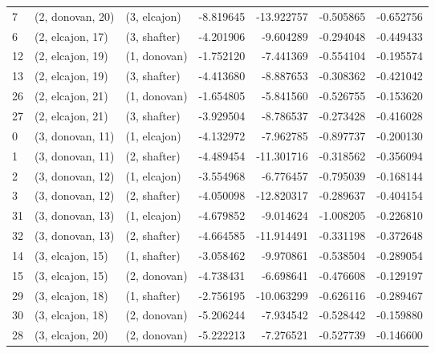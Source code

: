 \begin{tabular}{lllrrrr}
7  &  (2, donovan, 20) &     (3, elcajon) &  -8.819645 & -13.922757 &  -0.505865 & -0.652756 \\
6  &  (2, elcajon, 17) &     (3, shafter) &  -4.201906 &  -9.604289 &  -0.294048 & -0.449433 \\
12 &  (2, elcajon, 19) &     (1, donovan) &  -1.752120 &  -7.441369 &  -0.554104 & -0.195574 \\
13 &  (2, elcajon, 19) &     (3, shafter) &  -4.413680 &  -8.887653 &  -0.308362 & -0.421042 \\
26 &  (2, elcajon, 21) &     (1, donovan) &  -1.654805 &  -5.841560 &  -0.526755 & -0.153620 \\
27 &  (2, elcajon, 21) &     (3, shafter) &  -3.929504 &  -8.786537 &  -0.273428 & -0.416028 \\
0  &  (3, donovan, 11) &     (1, elcajon) &  -4.132972 &  -7.962785 &  -0.897737 & -0.200130 \\
1  &  (3, donovan, 11) &     (2, shafter) &  -4.489454 & -11.301716 &  -0.318562 & -0.356094 \\
2  &  (3, donovan, 12) &     (1, elcajon) &  -3.554968 &  -6.776457 &  -0.795039 & -0.168144 \\
3  &  (3, donovan, 12) &     (2, shafter) &  -4.050098 & -12.820317 &  -0.289637 & -0.404154 \\
31 &  (3, donovan, 13) &     (1, elcajon) &  -4.679852 &  -9.014624 &  -1.008205 & -0.226810 \\
32 &  (3, donovan, 13) &     (2, shafter) &  -4.664585 & -11.914491 &  -0.331198 & -0.372648 \\
14 &  (3, elcajon, 15) &     (1, shafter) &  -3.058462 &  -9.970861 &  -0.538504 & -0.289054 \\
15 &  (3, elcajon, 15) &     (2, donovan) &  -4.738431 &  -6.698641 &  -0.476608 & -0.129197 \\
29 &  (3, elcajon, 18) &     (1, shafter) &  -2.756195 & -10.063299 &  -0.626116 & -0.289467 \\
30 &  (3, elcajon, 18) &     (2, donovan) &  -5.206244 &  -7.934542 &  -0.528442 & -0.159880 \\
28 &  (3, elcajon, 20) &     (2, donovan) &  -5.222213 &  -7.276521 &  -0.527739 & -0.146600 \\
\bottomrule
\end{tabular}
